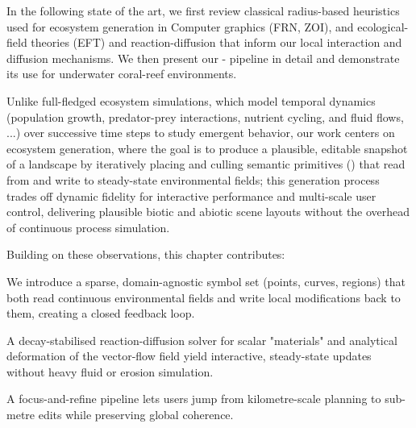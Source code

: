 In the following state of the art, we first review classical radius-based heuristics used for ecosystem generation in Computer graphics (FRN, ZOI), and ecological-field theories (EFT) and reaction-diffusion that inform our local interaction and diffusion mechanisms. We then present our - pipeline in detail and demonstrate its use for underwater coral-reef environments. %

Unlike full-fledged ecosystem simulations, which model temporal dynamics (population growth, predator-prey interactions, nutrient cycling, and fluid flows, ...) over successive time steps to study emergent behavior, our work centers on ecosystem generation, where the goal is to produce a plausible, editable snapshot of a landscape by iteratively placing and culling semantic primitives () that read from and write to steady-state environmental fields; this generation process trades off dynamic fidelity for interactive performance and multi-scale user control, delivering plausible biotic and abiotic scene layouts without the overhead of continuous process simulation.

Building on these observations, this chapter contributes:
\begin{Itemize}
\Item{}  We introduce a sparse, domain-agnostic symbol set (points, curves, regions) that both read continuous environmental fields and write local modifications back to them, creating a closed feedback loop.

\Item{}  A decay-stabilised reaction-diffusion solver for scalar "materials" and analytical deformation of the vector-flow field yield interactive, steady-state updates without heavy fluid or erosion simulation.

\Item{}  A focus-and-refine pipeline lets users jump from kilometre-scale planning to sub-metre edits while preserving global coherence. %

\end{Itemize}









